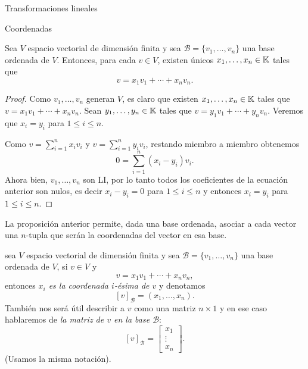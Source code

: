 \begin{chapter}{Transformaciones lineales}
\begin{section}{Coordenadas}
        \begin{proposicion}
            Sea $V$  espacio vectorial de dimensión finita y sea $\mathcal{B} = \{v_1,\ldots,v_n\}$ una base ordenada de $V$. Entonces, para cada $v \in V$,  existen únicos $x_1,\ldots,x_n \in \mathbb K$ tales que $$v =   x_1v_1 + \cdots +x_nv_n.$$
        \end{proposicion}
        \begin{proof}
            Como $v_1,\ldots,v_n$  generan $V$,  es claro que existen $x_1,\ldots,x_n \in \mathbb K$ tales que $v =   x_1v_1 + \cdots +x_nv_n$. Sean $y_1,\ldots,y_n \in \mathbb K$ tales que $v =   y_1v_1 + \cdots +y_nv_n$. Veremos que $x_i = y_i$ para $1 \le i \le n$.
            
            Como $v =  \sum_{i=1}^{n} x_iv_i$ y $v =  \sum_{i=1}^{n} y_iv_i$,  restando miembro a miembro obtenemos 
            $$
            0 =   \sum_{i=1}^{n} (x_i-y_i)v_i.
            $$
            Ahora bien,  $v_1,\ldots,v_n$ son  LI, por lo tanto todos los coeficientes de la ecuación anterior son nulos, es decir $x_i-y_i=0$ para $1 \le i \le n$ y entonces $x_i = y_i$ para $1 \le i \le n$.
        \end{proof}
    
    La proposición anterior permite, dada una base ordenada,  asociar a cada vector una $n$-tupla que serán la coordenadas del vector en esa base.
    
    \begin{definicion}
    sea $V$  espacio vectorial de dimensión finita y sea $\mathcal{B} = \{v_1,\ldots,v_n\}$ una base ordenada de $V$, si $v \in V$ y $$v =   x_1v_1 + \cdots +x_nv_n,$$  entonces \textit{$x_i$ es la coordenada $i$-ésima de $v$} y denotamos
    $$
    [v]_\mathcal{B} = (x_1,\ldots,x_n).
    $$
    También nos será útil describir a $v$ como una matriz $n \times 1$ y en ese caso hablaremos de \textit{la matriz de $v$  en la base  $\mathcal{B}$}:
    $$
    [v]_\mathcal{B} = \begin{bmatrix}x_1 \\ \vdots \\ x_n\end{bmatrix}.
    $$
    (Usamos la misma notación).
    \end{definicion}




\end{section}
\end{chapter}
